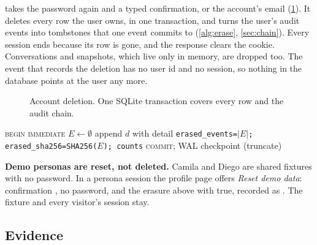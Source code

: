  takes the password again and a typed confirmation,  or the account's email
(\cref{fig:deletion}). It deletes every row the user owns, in one transaction, and turns the user's audit events into
tombstones that one  event commits to (\cref{alg:erase}, \cref{sec:chain}). Every session ends
because its row is gone, and the response clears the cookie. Conversations and snapshots, which live only in memory,
are dropped too. The event that records the deletion has no user id and no session, so nothing in the database points
at the user any more.

\begin{figure}[htbp]
  \centering
  
  \caption{Account deletion. One SQLite transaction covers every row and the audit chain.}\label{fig:deletion}
\end{figure}

\begin{algorithm}[htbp]
  \caption{Erasure (\texttt{SqliteAccountErasure.erase} in \texttt{sqlite.py}).}\label{alg:erase}
  \textsc{begin immediate}\;
  $E \gets \emptyset$\;
  append $d$ with detail \texttt{erased\_events=$|E|$; erased\_sha256=SHA256($E$); counts}\;
  \textsc{commit}; WAL checkpoint (truncate)\;
\end{algorithm}

\textbf{Demo personas are reset, not deleted.} Camila and Diego are shared fixtures with no password. In a persona
session the profile page offers \emph{Reset demo data}: confirmation , no password, and the erasure above
with  true, recorded as . The fixture and every visitor's session stay.

\subsection{Evidence}

